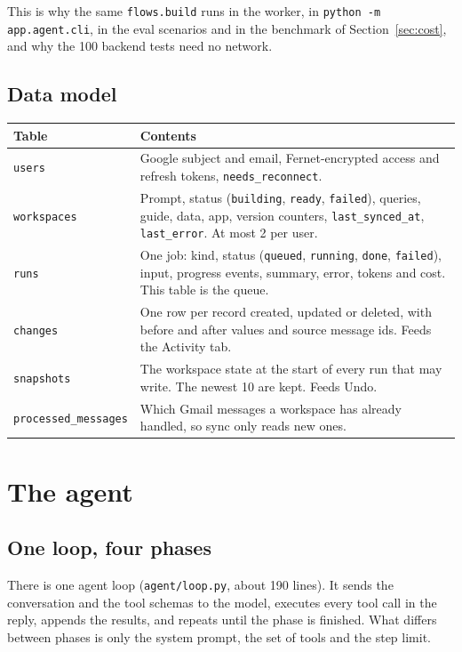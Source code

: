 \documentclass[10pt,a4paper]{article}
\newcommand{\code}[1]{\texttt{\small #1}}
\newcommand{\file}[1]{\texttt{\small #1}}
\begin{document}
This is why the same \code{flows.build} runs in the worker, in \code{python -m app.agent.cli},
in the eval scenarios and in the benchmark of Section~\ref{sec:cost}, and why the 100 backend
tests need no network.

\subsection{Data model}

\begin{center}\small
\begin{tabularx}{\linewidth}{@{}P{3.2cm}L@{}}
\toprule
\textbf{Table} & \textbf{Contents} \\
\midrule
\code{users} & Google subject and email, Fernet-encrypted access and refresh tokens, \code{needs\_reconnect}. \\
\code{workspaces} & Prompt, status (\code{building}, \code{ready}, \code{failed}), queries, guide, data, app, version counters, \code{last\_synced\_at}, \code{last\_error}. At most 2 per user. \\
\code{runs} & One job: kind, status (\code{queued}, \code{running}, \code{done}, \code{failed}), input, progress events, summary, error, tokens and cost. This table is the queue. \\
\code{changes} & One row per record created, updated or deleted, with before and after values and source message ids. Feeds the Activity tab. \\
\code{snapshots} & The workspace state at the start of every run that may write. The newest 10 are kept. Feeds Undo. \\
\code{processed\_messages} & Which Gmail messages a workspace has already handled, so sync only reads new ones. \\
\bottomrule
\end{tabularx}
\end{center}

\section{The agent}

\subsection{One loop, four phases}

There is one agent loop (\file{agent/loop.py}, about 190 lines). It sends the conversation and
the tool schemas to the model, executes every tool call in the reply, appends the results, and
repeats until the phase is finished. What differs between phases is only the system prompt,
the set of tools and the step limit.
\end{document}
